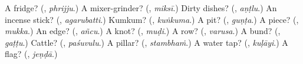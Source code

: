 \begin{tcolorbox}[breakable,colback=teal!4,colframe=teal!35!black,title={Before you move on}]
A fridge? (\textbf{}, \emph{phrijju}.) A mixer-grinder? (\textbf{}, \emph{miksī}.) Dirty dishes? (\textbf{}, \emph{aṇṭlu}.) An incense stick? (\textbf{}, \emph{agarubatti}.) Kumkum? (\textbf{}, \emph{kuṅkuma}.) A pit? (\textbf{}, \emph{guṇṭa}.) A piece? (\textbf{}, \emph{mukka}.) An edge? (\textbf{}, \emph{añcu}.) A knot? (\textbf{}, \emph{muḍi}.) A row? (\textbf{}, \emph{varusa}.) A bund? (\textbf{}, \emph{gaṭṭu}.) Cattle? (\textbf{}, \emph{paśuvulu}.) A pillar? (\textbf{}, \emph{stambhaṁ}.) A water tap? (\textbf{}, \emph{kuḷāyi}.) A flag? (\textbf{}, \emph{jeṇḍā}.)
\end{tcolorbox}
